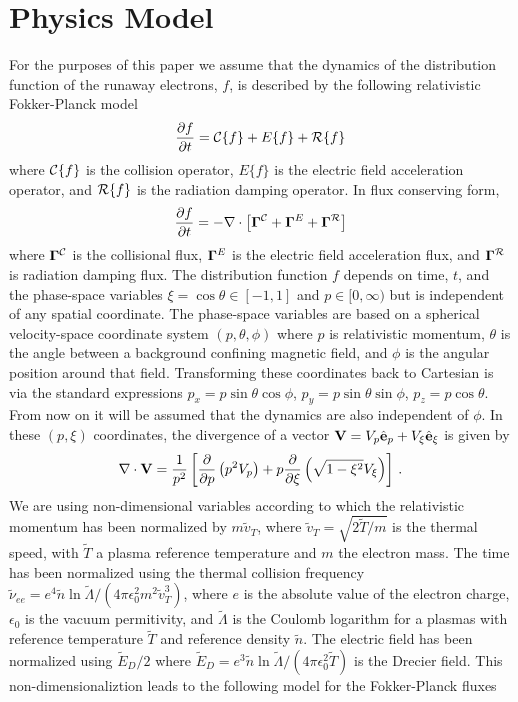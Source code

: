 \documentclass[preprint,11pt]{elsarticle}
\newcommand{\bq}{\begin{equation}}
\newcommand{\eq}{\end{equation}}
\begin{document}
\section{Physics Model}
\label{sec:Mod}
%
For the purposes of this paper we assume that the dynamics of the distribution function of the runaway electrons, $f$, is described by the following relativistic Fokker-Planck model
%
\bq
\label{fokkerplanckmodel}
\frac{\partial f}{\partial t}=  {\cal C} \{ f \} +E\{f\} + {\cal R}\{f\}
\eq
%
where ${\cal C} \{ f \}$ is the collision operator, $E\{f\}$ is the electric field acceleration operator, and ${\cal R}\{f\}$ is the radiation damping operator. In flux conserving form, 
%
\bq
\label{eq:fluxconservform}
\frac{\partial f}{\partial t}= - \nabla \cdot \left [ {\bf \Gamma}^{\cal C}+ {\bf \Gamma}^E+ {\bf \Gamma}^{\cal R}\right] 
\eq
%
where ${\bf \Gamma}^{\cal C}$ is the collisional flux, ${\bf \Gamma}^E$ is the electric field acceleration flux, and ${\bf \Gamma}^{\cal R}$ is radiation damping flux. The distribution function $f$ depends on time, $t$, and the phase-space variables $\xi=\cos \theta \in [-1,1]$  and $p\in [0, \infty)$ but is independent of any spatial coordinate. The phase-space variables are based on a spherical velocity-space coordinate system  $(p,\theta,\phi)$ where $p$ is relativistic momentum, $\theta$ is the angle between a background confining magnetic field, and $\phi$ is the angular position around that field. Transforming these coordinates back to Cartesian is via the standard expressions $p_x= p \sin \theta \cos \phi$, $p_y= p \sin \theta \sin \phi$, $p_z= p \cos \theta$. From now on it will be assumed that the dynamics are also independent of $\phi$. In these $(p,\xi)$ coordinates, the divergence of a vector ${\bf V}=V_p \hat {\bf e}_p+V_\xi \hat {\bf e}_\xi$ is given by
%
\bq
\nabla \cdot {\bf V}=\frac{1}{p^2}\left[ \frac{\partial }{\partial p} \left( p^2 V_p\right) 
+ p  \frac{\partial }{\partial \xi} \left( \sqrt{1-\xi^2}  V_\xi \right) 
\right ] \, .
\eq
%
We are using non-dimensional variables according to which the relativistic momentum has been normalized by $m \tilde{v}_T$, where $\tilde{v}_T=\sqrt{2 \tilde{T}/m}$ is the thermal speed, with $\tilde{T}$ a plasma reference temperature and $m$ the electron mass. The time has been normalized using the thermal collision frequency 
$\tilde{\nu}_{ee}=e^4 \tilde{n}\ln \tilde{\Lambda}/(4 \pi \epsilon_0^2 m^2 \tilde{v}_T^3)$, where $e$ is the absolute value of the electron charge, $\epsilon_0$ is the vacuum permitivity, and $\tilde{\Lambda}$ is the Coulomb logarithm for a plasmas with reference temperature $\tilde{T}$ and reference density $\tilde{n}$. The electric field has been normalized using $\tilde{E}_D/2$ where $\tilde{E}_D= e^3 \tilde{n}\ln \tilde{\Lambda}/(4 \pi \epsilon_0^2 \tilde{T})$ is the Drecier field. This non-dimensionaliztion leads to the following model for the Fokker-Planck fluxes
\end{document}
